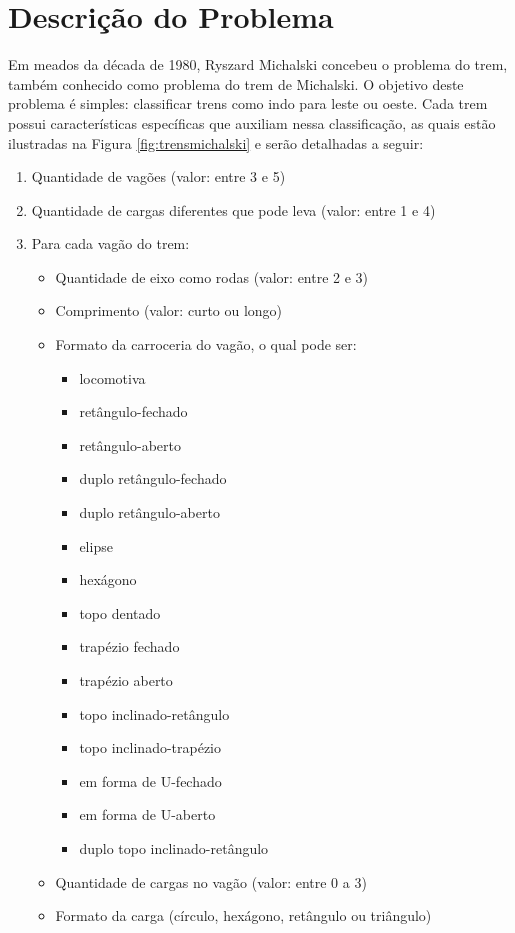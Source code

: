 \documentclass[12pt]{article}
\begin{document}
\section{Descrição do Problema}
    Em meados da década de 1980, Ryszard Michalski concebeu o problema do trem, também conhecido como problema do trem de Michalski.  O objetivo deste problema é simples: classificar trens como indo para leste ou oeste. Cada trem possui características específicas que auxiliam nessa classificação, as quais estão ilustradas na Figura \ref{fig:trensmichalski} e serão detalhadas a seguir:
    \begin{enumerate}
        \item Quantidade de vagões (valor: entre 3 e 5)
        \item Quantidade de cargas diferentes que pode leva (valor: entre 1 e 4)
        \item Para cada vagão do trem:
        \begin{itemize}
            \item Quantidade de eixo como rodas (valor: entre 2 e 3)
            \item Comprimento (valor: curto ou longo)
            \item Formato da carroceria do vagão, o qual pode ser:
            \begin{itemize}
                \item locomotiva
                \item retângulo-fechado
                \item retângulo-aberto
                \item duplo retângulo-fechado
                \item duplo retângulo-aberto
                \item elipse
                \item hexágono
                \item topo dentado
                \item trapézio fechado
                \item trapézio aberto
                \item topo inclinado-retângulo
                \item topo inclinado-trapézio
                \item em forma de U-fechado
                \item em forma de U-aberto
                \item duplo topo inclinado-retângulo
            \end{itemize}
            \item Quantidade de cargas no vagão (valor: entre 0 a 3)
            \item Formato da carga (círculo, hexágono, retângulo ou triângulo)
        \end{itemize}
    \end{enumerate}
\end{document}
